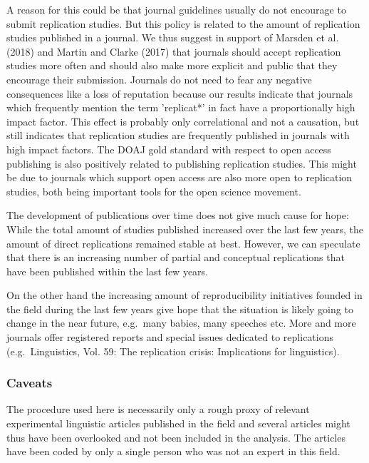 \documentclass[]{elsarticle} %
\begin{document}
A reason for this could be that journal guidelines usually do not
encourage to submit replication studies. But this policy is related to
the amount of replication studies published in a journal. We thus
suggest in support of Marsden et al. (2018) and Martin and Clarke (2017)
that journals should accept replication studies more often and should
also make more explicit and public that they encourage their submission.
Journals do not need to fear any negative consequences like a loss of
reputation because our results indicate that journals which frequently
mention the term 'replicat*' in fact have a proportionally high impact
factor. This effect is probably only correlational and not a causation,
but still indicates that replication studies are frequently published in
journals with high impact factors. The DOAJ gold standard with respect
to open access publishing is also positively related to publishing
replication studies. This might be due to journals which support open
access are also more open to replication studies, both being important
tools for the open science movement.

The development of publications over time does not give much cause for
hope: While the total amount of studies published increased over the
last few years, the amount of direct replications remained stable at
best. However, we can speculate that there is an increasing number of
partial and conceptual replications that have been published within the
last few years.

On the other hand the increasing amount of reproducibility initiatives
founded in the field during the last few years give hope that the
situation is likely going to change in the near future, e.g.~many
babies, many speeches etc. More and more journals offer registered
reports and special issues dedicated to replications (e.g.~Linguistics,
Vol. 59: The replication crisis: Implications for linguistics).

\hypertarget{caveats}{%
\subsubsection{Caveats}\label{caveats}}

The procedure used here is necessarily only a rough proxy of relevant
experimental linguistic articles published in the field and several
articles might thus have been overlooked and not been included in the
analysis. The articles have been coded by only a single person who was
not an expert in this field.
\end{document}
